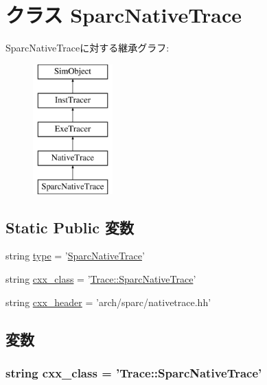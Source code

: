 \hypertarget{classSparcNativeTrace_1_1SparcNativeTrace}{
\section{クラス SparcNativeTrace}
\label{classSparcNativeTrace_1_1SparcNativeTrace}
}
SparcNativeTraceに対する継承グラフ:\begin{figure}[H]
\begin{center}
\leavevmode
\includegraphics[height=5cm]{classSparcNativeTrace_1_1SparcNativeTrace}
\end{center}
\end{figure}
\subsection*{Static Public 変数}
\begin{DoxyCompactItemize}
\item 
string \hyperlink{classSparcNativeTrace_1_1SparcNativeTrace_acce15679d830831b0bbe8ebc2a60b2ca}{type} = '\hyperlink{classSparcNativeTrace_1_1SparcNativeTrace}{SparcNativeTrace}'
\item 
string \hyperlink{classSparcNativeTrace_1_1SparcNativeTrace_a58cd55cd4023648e138237cfc0822ae3}{cxx\_\-class} = '\hyperlink{classTrace_1_1SparcNativeTrace}{Trace::SparcNativeTrace}'
\item 
string \hyperlink{classSparcNativeTrace_1_1SparcNativeTrace_a17da7064bc5c518791f0c891eff05fda}{cxx\_\-header} = 'arch/sparc/nativetrace.hh'
\end{DoxyCompactItemize}


\subsection{変数}
\hypertarget{classSparcNativeTrace_1_1SparcNativeTrace_a58cd55cd4023648e138237cfc0822ae3}{
\subsubsection[{cxx\_\-class}]{\setlength{\rightskip}{0pt plus 5cm}string {\bf cxx\_\-class} = '{\bf Trace::SparcNativeTrace}'}}
\label{classSparcNativeTrace_1_1SparcNativeTrace_a58cd55cd4023648e138237cfc0822ae3}



